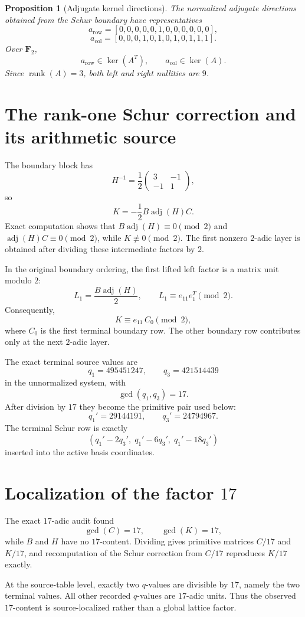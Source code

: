 \documentclass[11pt]{article}
\newtheorem{proposition}[theorem]{Proposition}
\theoremstyle{definition}
\theoremstyle{remark}
\begin{document}
\begin{proposition}[Adjugate kernel directions]
The normalized adjugate directions obtained from the Schur boundary have representatives
\[
a_{\mathrm{row}}=[0,0,0,0,0,1,0,0,0,0,0,0],
\]
\[
a_{\mathrm{col}}=[0,0,0,1,0,1,0,1,0,1,1,1].
\]
Over $\mathbf F_2$,
\[
a_{\mathrm{row}}\in\ker(A^T),
\qquad
 a_{\mathrm{col}}\in\ker(A).
\]
Since $\operatorname{rank}(A)=3$, both left and right nullities are $9$.
\end{proposition}

\section{The rank-one Schur correction and its arithmetic source}
The boundary block has
\[
H^{-1}=\frac12
\begin{pmatrix}3&-1\\-1&1\end{pmatrix},
\]
so
\[
K=-\frac12B\operatorname{adj}(H)C.
\]
Exact computation shows that $B\operatorname{adj}(H)\equiv0\pmod2$ and $\operatorname{adj}(H)C\equiv0\pmod2$, while $K\not\equiv0\pmod2$. The first nonzero $2$-adic layer is obtained after dividing these intermediate factors by $2$.

In the original boundary ordering, the first lifted left factor is a matrix unit modulo $2$:
\[
L_1=\frac{B\operatorname{adj}(H)}2,
\qquad
L_1\equiv e_{11}e_1^T\pmod2.
\]
Consequently,
\[
K\equiv e_{11}\,C_{0}\pmod2,
\]
where $C_0$ is the first terminal boundary row. The other boundary row contributes only at the next $2$-adic layer.

The exact terminal source values are
\[
q_1=495451247,
\qquad
q_3=421514439
\]
in the unnormalized system, with
\[
\gcd(q_1,q_3)=17.
\]
After division by $17$ they become the primitive pair used below:
\[
q_1'=29144191,
\qquad
q_3'=24794967.
\]
The terminal Schur row is exactly
\[
(q_1'-2q_3',\;q_1'-6q_3',\;q_1'-18q_3')
\]
inserted into the active basis coordinates.

\section{Localization of the factor $17$}
The exact $17$-adic audit found
\[
\gcd(C)=17,
\qquad
\gcd(K)=17,
\]
while $B$ and $H$ have no $17$-content. Dividing gives primitive matrices $C/17$ and $K/17$, and recomputation of the Schur correction from $C/17$ reproduces $K/17$ exactly.

At the source-table level, exactly two $q$-values are divisible by $17$, namely the two terminal values. All other recorded $q$-values are $17$-adic units. Thus the observed $17$-content is source-localized rather than a global lattice factor.
\end{document}
